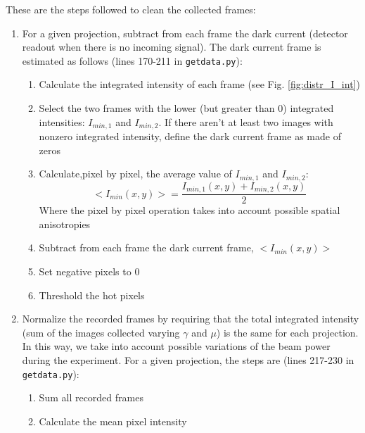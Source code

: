 \documentclass[11pt]{scrartcl}
\begin{document}
These are the steps followed to clean the collected frames:
\begin{enumerate}
    \item For a given projection, subtract from each frame the dark current (detector readout when there is no incoming signal). The dark current frame is estimated as follows (lines 170-211 in {\texttt{getdata.py}}):
    \begin{enumerate}
        \item Calculate the integrated intensity of each frame (see Fig. \ref{fig:distr_I_int})
        
        \item Select the two frames with the lower (but greater than 0) integrated intensities: $I_{min,1}$ and $I_{min,2}$. If there aren't at least two images with nonzero integrated intensity, define the dark current frame as made of zeros
        
        \item Calculate,pixel by pixel, the average value of $I_{min,1}$ and $I_{min,2}$: 
        \begin{equation}
            <I_{min}(x,y)> = \frac{I_{min,1}(x,y) + I_{min,2}(x,y)}{2}
        \end{equation}
        Where the pixel by pixel operation takes into account possible spatial anisotropies
        
        \item Subtract from each frame the dark current frame, $<I_{min}(x,y)>$
        
        \item Set negative pixels to 0
        
        \item Threshold the hot pixels
    \end{enumerate}
    
    \item Normalize the recorded frames by requiring that the total integrated intensity (sum of the images collected varying $\gamma$ and $\mu$) is the same for each projection. In this way, we take into account possible
    variations of the beam power during the experiment. For a given projection, the steps are (lines 217-230 in {\texttt{getdata.py}}):
    \begin{enumerate}
        \item Sum all recorded frames
        
        \item Calculate the mean pixel intensity
        

\end{enumerate}
\end{enumerate}
\end{document}
